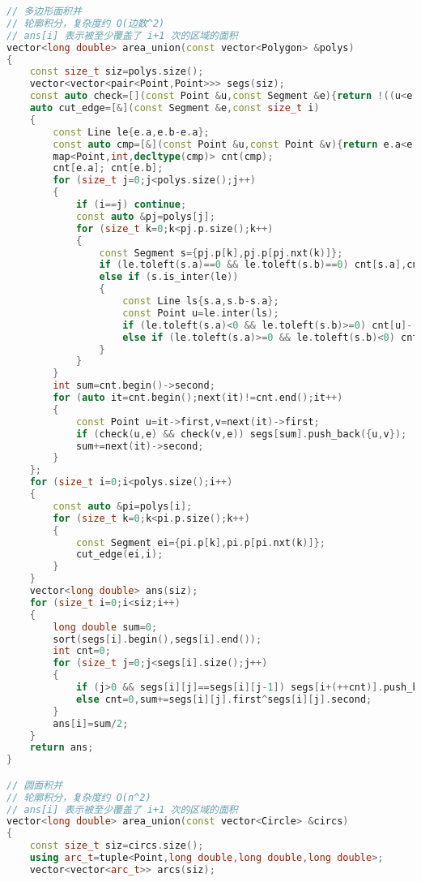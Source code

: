 \documentclass[a4paper]{book}
\begin{document}
\begin{lstlisting}[language=c++]
// 多边形面积并
// 轮廓积分，复杂度约 O(边数^2)
// ans[i] 表示被至少覆盖了 i+1 次的区域的面积
vector<long double> area_union(const vector<Polygon> &polys)
{
    const size_t siz=polys.size();
    vector<vector<pair<Point,Point>>> segs(siz);
    const auto check=[](const Point &u,const Segment &e){return !((u<e.a && u<e.b) || (u>e.a && u>e.b));};
    auto cut_edge=[&](const Segment &e,const size_t i)
    {
        const Line le{e.a,e.b-e.a};
        const auto cmp=[&](const Point &u,const Point &v){return e.a<e.b?u<v:u>v;};
        map<Point,int,decltype(cmp)> cnt(cmp);
        cnt[e.a]; cnt[e.b];
        for (size_t j=0;j<polys.size();j++)
        {
            if (i==j) continue;
            const auto &pj=polys[j];
            for (size_t k=0;k<pj.p.size();k++)
            {
                const Segment s={pj.p[k],pj.p[pj.nxt(k)]};
                if (le.toleft(s.a)==0 && le.toleft(s.b)==0) cnt[s.a],cnt[s.b];
                else if (s.is_inter(le))
                {
                    const Line ls{s.a,s.b-s.a};
                    const Point u=le.inter(ls);
                    if (le.toleft(s.a)<0 && le.toleft(s.b)>=0) cnt[u]--;
                    else if (le.toleft(s.a)>=0 && le.toleft(s.b)<0) cnt[u]++;
                }
            }
        }
        int sum=cnt.begin()->second;
        for (auto it=cnt.begin();next(it)!=cnt.end();it++)
        {
            const Point u=it->first,v=next(it)->first;
            if (check(u,e) && check(v,e)) segs[sum].push_back({u,v});
            sum+=next(it)->second;
        }
    };
    for (size_t i=0;i<polys.size();i++)
    {
        const auto &pi=polys[i];
        for (size_t k=0;k<pi.p.size();k++)
        {
            const Segment ei={pi.p[k],pi.p[pi.nxt(k)]};
            cut_edge(ei,i);
        }
    }
    vector<long double> ans(siz);
    for (size_t i=0;i<siz;i++)
    {
        long double sum=0;
        sort(segs[i].begin(),segs[i].end());
        int cnt=0;
        for (size_t j=0;j<segs[i].size();j++)
        {
            if (j>0 && segs[i][j]==segs[i][j-1]) segs[i+(++cnt)].push_back(segs[i][j]);
            else cnt=0,sum+=segs[i][j].first^segs[i][j].second;
        }
        ans[i]=sum/2;
    }
    return ans;
}

// 圆面积并
// 轮廓积分，复杂度约 O(n^2)
// ans[i] 表示被至少覆盖了 i+1 次的区域的面积
vector<long double> area_union(const vector<Circle> &circs)
{
    const size_t siz=circs.size();
    using arc_t=tuple<Point,long double,long double,long double>;
    vector<vector<arc_t>> arcs(siz);


\end{lstlisting}
\end{document}
